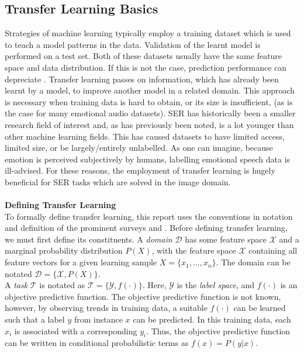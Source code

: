 \subsection{Transfer Learning Basics}
Strategies of machine learning typically employ a training dataset which is used to teach a model patterns in the data. Validation of the learnt model is performed on a test set. Both of these datasets usually have the same feature space and data distribution. If this is not the case, prediction performance can depreciate \cite{SHIMODAIRA2000}. Transfer learning passes on information, which has already been learnt by a model, to improve another model in a related domain. This approach is necessary when training data is hard to obtain, or its size is insufficient, (as is the case for many emotional audio datasets). SER has historically been a smaller research field of interest and, as has previously been noted, is a lot younger than other machine learning fields. This has caused datasets to have limited access, limited size, or be largely/entirely unlabelled. As one can imagine, because emotion is perceived subjectively by humans, labelling emotional speech data is ill-advised. For these reasons, the employment of transfer learning is hugely beneficial for SER tasks which are solved in the image domain.\\ \\
\textbf{Defining Transfer Learning}\\
To formally define transfer learning, this report uses the conventions in notation and definition of the prominent surveys \cite{IEEE_TL_Survey} and \cite{2016transfer_survey}. Before defining transfer learning, we must first define its constituents. A \textit{domain} $\mathcal{D}$ has some feature space $\mathcal{X}$ and a marginal probability distribution $P(X)$, with the feature space $\mathcal{X}$ containing all feature vectors for a given learning sample $X = \{ x_1, ..., x_n \}$. The domain can be notated $\mathcal{D} = \{ \mathcal{X}, P(X) \}$.\\
A \textit{task} $\mathcal{T}$ is notated as $\mathcal{T} = \{ \mathcal{Y}, f(\cdot) \}$. Here, $\mathcal{Y}$ is the \textit{label space}, and $f(\cdot)$ is an objective predictive function. The objective predictive function is not known, however, by observing trends in training data, a suitable $f(\cdot)$ can be learned such that a label $y$ from instance $x$ can be predicted. In this training data, each $x_i$ is associated with a corresponding $y_i$. Thus, the objective predictive function can be written in conditional probabilistic terms as $f(x) = P(y|x)$.\\
